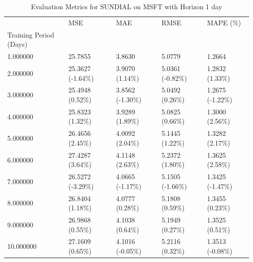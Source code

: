 \begin{table}
\caption{Evaluation Metrics for SUNDIAL on MSFT with Horizon 1 day}
\label{tab:sundial_MSFT_h1_metrics}
\begin{tabular}{lllll}
\toprule
 & MSE & MAE & RMSE & MAPE (\%) \\
Training Period (Days) &  &  &  &  \\
\midrule
1.000000 & 25.7855 & 3.8630 & 5.0779 & 1.2664 \\
2.000000 & 25.3627 (-1.64\%) & 3.9070 (1.14\%) & 5.0361 (-0.82\%) & 1.2832 (1.33\%) \\
3.000000 & 25.4948 (0.52\%) & 3.8562 (-1.30\%) & 5.0492 (0.26\%) & 1.2675 (-1.22\%) \\
4.000000 & 25.8323 (1.32\%) & 3.9289 (1.89\%) & 5.0825 (0.66\%) & 1.3000 (2.56\%) \\
5.000000 & 26.4656 (2.45\%) & 4.0092 (2.04\%) & 5.1445 (1.22\%) & 1.3282 (2.17\%) \\
6.000000 & 27.4287 (3.64\%) & 4.1148 (2.63\%) & 5.2372 (1.80\%) & 1.3625 (2.58\%) \\
7.000000 & 26.5272 (-3.29\%) & 4.0665 (-1.17\%) & 5.1505 (-1.66\%) & 1.3425 (-1.47\%) \\
8.000000 & 26.8404 (1.18\%) & 4.0777 (0.28\%) & 5.1808 (0.59\%) & 1.3455 (0.23\%) \\
9.000000 & 26.9868 (0.55\%) & 4.1038 (0.64\%) & 5.1949 (0.27\%) & 1.3525 (0.51\%) \\
10.000000 & 27.1609 (0.65\%) & 4.1016 (-0.05\%) & 5.2116 (0.32\%) & 1.3513 (-0.08\%) \\
\bottomrule
\end{tabular}
\end{table}
